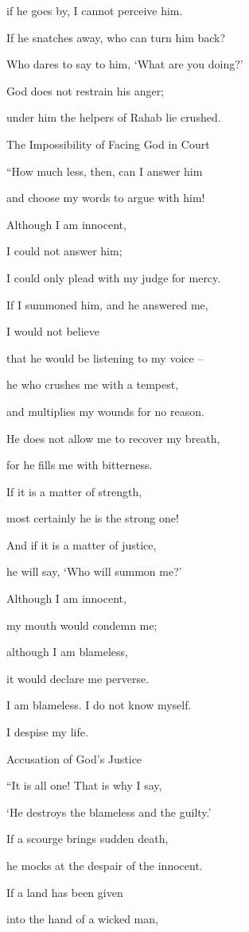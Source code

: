{\par }{\Q if he goes
by, I cannot
perceive him.
\par }{\Q {}If
he snatches
away, who can
turn him back?

\par }{\Q Who dares
to say
to him,
‘What
are you doing?’
\par }{\Q {}God
does not
restrain
his anger;
\par }{\Q under
him
the helpers
of Rahab lie crushed.
\par }{\SH The Impossibility of Facing God in Court
\par }{\Q {}“How much
less,
then, can I
answer
him

\par }{\Q and choose
my words
to argue with him!
\par }{\Q {}Although
I am innocent,
\par }{\Q I could not
answer
him;

\par }{\Q I could only plead with my judge
for mercy.
\par }{\Q {}If
I summoned
him, and he answered
me,

\par }{\Q I would not
believe
\par }{\Q that
he would be listening
to my voice –
\par }{\Q {}he who
crushes
me with a tempest,
\par }{\Q and multiplies
my wounds
for no reason.
\par }{\Q {}He does not
allow
me to recover
my breath,
\par }{\Q for
he fills
me with bitterness.
\par }{\Q {}If
it is a matter of strength,
\par }{\Q most certainly
he is the strong one!
\par }{\Q And if
it is a matter of justice,
\par }{\Q he will say, ‘Who
will summon me?’
\par }{\Q {}Although
I am innocent,
\par }{\Q my mouth
would condemn
me;

\par }{\Q although I am
blameless,
\par }{\Q it would declare me perverse.
\par }{\Q {}I am blameless.
I
do not
know
myself.
\par }{\Q I despise
my life.
\par }{\SH Accusation of God’s Justice
\par }{\Q {}“It is all one! That
is why
I say,
\par }{\Q ‘He destroys
the blameless
and the guilty.’
\par }{\Q {}If
a scourge
brings sudden
death,
\par }{\Q he mocks
at the despair
of the innocent.
\par }{\Q {}If a land
has been given
\par }{\Q into the hand
of a wicked
man,

}
